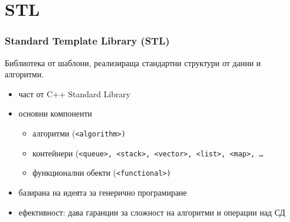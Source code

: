\documentclass{beamer}
\begin{document}
\section{STL}

\begin{frame}
  \frametitle{Standard Template Library (STL)}

  Библиотека от шаблони, реализираща стандартни структури от данни и алгоритми.

  \begin{itemize}
  \item част от C++ Standard Library
  \item основни компоненти
    \begin{itemize}
    \item алгоритми (\tt{<algorithm>})
    \item контейнери (\tt{<queue>}, \tt{<stack>}, \tt{<vector>}, \tt{<list>}, \tt{<map>}, \ldots
    \item функционални обекти (\tt{<functional>})
    \end{itemize}
  \item базирана на идеята за генерично програмиране
  \item ефективност: дава гаранции за сложност на алгоритми и операции над СД
  \end{itemize}
\end{frame}
\end{document}
